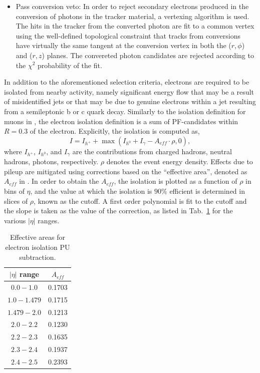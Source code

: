 \begin{itemize}
\item Pass conversion veto: In order to reject secondary electrons produced in the conversion of photons in the tracker material, a vertexing algorithm is used. The hits in the tracker from the converted photon are fit to a common vertex using the well-defined topological constraint that tracks from conversions have virtually the same tangent at the conversion vertex in both the ($r,\phi$) and ($r,z$) planes. The convereted photon candidates are rejected according to the $\chi^2$ probability of the fit. 
\end{itemize}

In addition to the aforementioned selection criteria, electrons are required to be isolated from nearby activity, namely significant energy flow that may be a result of misidentified jets or that may be due to genuine electrons within a jet resulting from a semileptonic b or c quark decay. Similarly to the isolation definition for muons in , the electron isolation definition is a sum of PF-candidates within $R=0.3$ of the electron. Explicitly, the isolation is computed as,
\begin{equation}
  I = I_{h^+} + \max\left(I_{h^0} + I_{\gamma} - A_{eff}\cdot\rho, 0\right),
  \label{eq:eleIso}
\end{equation}
where $I_{h^+}$, $I_{h^0}$, and $I_{\gamma}$ are the contributions from charged hadrons, neutral hadrons, photons, respectively. $\rho$ denotes the event energy density. Effects due to pileup are mitigated using corrections based on the ``effective area'', denoted as $A_{eff}$ in . In order to obtain the $A_{eff}$, the isolation is plotted as a function of $\rho$ in bins of $\eta$, and the value at which the isolation is $90\%$ efficient is determined in slices of $\rho$, known as the cutoff. A first order polynomial is fit to the cutoff and the slope is taken as the value of the correction, as listed in Tab.~\ref{tab:ea} for the various $|\eta|$ ranges.

\begin{table}[!ht]
\centering
\begin{tabular}{|c|c|}
\hline
$|\eta|$ range     & $A_{eff}$ \\
\hline
$ 0.0 - 1.0$       & 0.1703 \\
$ 1.0 - 1.479$     & 0.1715 \\
$1.479 - 2.0$      & 0.1213 \\
$2.0 - 2.2$        & 0.1230 \\
$2.2 - 2.3$        & 0.1635 \\
$2.3 - 2.4$        & 0.1937 \\
$2.4 - 2.5$        & 0.2393 \\
\hline
\end{tabular}
\caption{Effective areas for electron isolation PU subtraction.}
\label{tab:ea}
\end{table}

